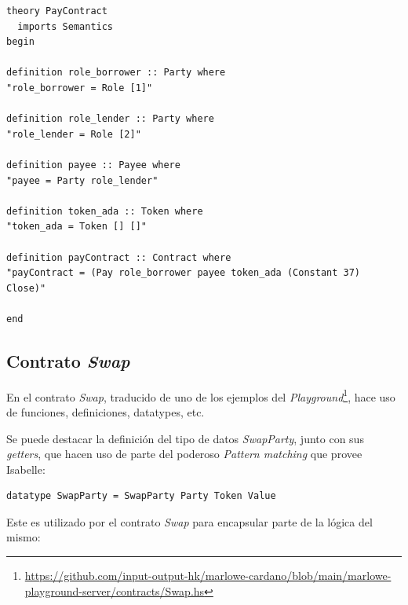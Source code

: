 \documentclass[12pt]{book}
\begin{document}
\begin{lstlisting}[style=Isabelle, caption=Contrato \textit{Pay}]
theory PayContract
  imports Semantics
begin

definition role_borrower :: Party where
"role_borrower = Role [1]"

definition role_lender :: Party where
"role_lender = Role [2]"

definition payee :: Payee where
"payee = Party role_lender"

definition token_ada :: Token where
"token_ada = Token [] []"

definition payContract :: Contract where
"payContract = (Pay role_borrower payee token_ada (Constant 37) Close)"

end
\end{lstlisting}

\subsection{Contrato \textit{Swap}}

En el contrato \textit{Swap}, traducido de uno de los ejemplos del \textit{Playground}\footnote{\url{https://github.com/input-output-hk/marlowe-cardano/blob/main/marlowe-playground-server/contracts/Swap.hs}}, hace uso de funciones, definiciones, datatypes, etc. 

Se puede destacar la definición del tipo de datos \textit{SwapParty}, junto con sus \textit{getters}, que hacen uso de parte del poderoso \textit{Pattern matching} que provee Isabelle:

\begin{lstlisting}[style=Isabelle]
datatype SwapParty = SwapParty Party Token Value
\end{lstlisting}

Este es utilizado por el contrato \textit{Swap} para encapsular parte de la lógica del mismo:
\end{document}
